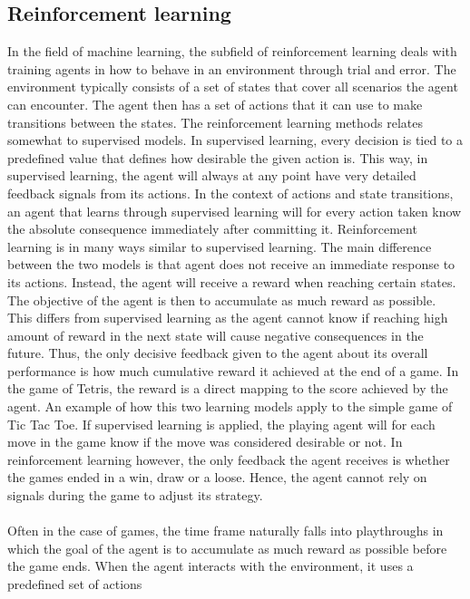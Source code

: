 \subsection{Reinforcement learning \label{RL}}

In the field of machine learning, the subfield of reinforcement learning
deals with training agents in how to behave in an environment through
trial and error. The environment typically consists of a set of states that cover all
scenarios the agent can encounter. The agent then has a set of actions
that it can use to make transitions between the states. 
The reinforcement learning methods relates somewhat 
to supervised models.
In supervised learning, every decision is tied to a predefined value
that defines how desirable the given action is. This way, in supervised learning,
the agent will always at any point have very detailed feedback signals from its actions.
In the context of actions and state transitions, an agent that learns through
supervised learning will for every action taken know the absolute consequence
immediately after committing it.
Reinforcement learning is in many ways similar to supervised learning. 
The main difference between the two models is that agent does not receive 
an immediate response to its actions. Instead, the agent will receive a reward
when reaching certain states. The objective of the agent is then to
accumulate as much reward as possible. This differs from supervised learning
as the agent cannot know if reaching high amount of reward in the next state
will cause negative consequences in the future. Thus, the only decisive 
feedback given to the agent about its overall performance is 
how much cumulative reward it achieved at the end of a game.
In the game of Tetris, the reward is a direct mapping to 
the score achieved by the agent.
An example of how this two learning models apply to the simple game of
Tic Tac Toe. If supervised learning
is applied, the playing agent will for each move in the game know
if the move was considered desirable or not. 
In reinforcement learning however, the only feedback the agent receives
is whether the games ended in a win, draw or a loose. Hence, the agent
cannot rely on signals during the game to adjust its strategy.\\
\\
Often in the case of games, the 
time frame naturally falls into playthroughs in which the 
goal of the agent is to accumulate as much reward as possible 
before the game ends.
When the agent interacts 
with the environment, it uses a predefined set of actions
